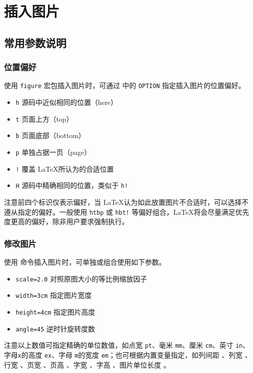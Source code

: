 \section{插入图片}
\subsection{常用参数说明}
\subsubsection{位置偏好}
使用 \texttt{figure} 宏包插入图片时，可通过 \latex{\begin{figure}[OPTION]} 中的 \texttt{OPTION} 指定插入图片的位置偏好。

\begin{itemize}
    \item \texttt{h} 源码中近似相同的位置（here）
    \item \texttt{t} 页面上方（top）
    \item \texttt{b} 页面底部（bottom）
    \item \texttt{p} 单独占据一页（page）
    \item \texttt{!} 覆盖 \LaTeX 所认为的合适位置
    \item \texttt{H} 源码中精确相同的位置，类似于 \texttt{h!}
\end{itemize}

注意前四个标识仅表示偏好，当 \LaTeX 认为如此放置图片不合适时，可以选择不遵从指定的偏好。一般使用 \texttt{htbp} 或 \texttt{hbt!} 等偏好组合，\LaTeX 将会尽量满足优先度更高的偏好，除非用户要求强制执行。

\subsubsection{修改图片}
使用  命令插入图片时，可单独或组合使用如下参数。

\begin{itemize}
    \item \texttt{scale=2.0} 对照原图大小的等比例缩放因子
    \item \texttt{width=3cm} 指定图片宽度
    \item \texttt{height=4cm} 指定图片高度
    \item \texttt{angle=45} 逆时针旋转度数
\end{itemize}

注意以上数值可指定精确的单位数值，如点宽 \texttt{pt}、毫米 \texttt{mm}、厘米 \texttt{cm}、英寸 \texttt{in}、字母\texttt{x}的高度 \texttt{ex}、字母 \texttt{m}的宽度 \texttt{em}；也可根据内置变量指定，如列间距 \latex{\columnsep}、列宽 \latex{\columnwidth}、行宽 \latex{\linewidth}、页宽 \latex{\paperwidth}、页高 \latex{\paperheight}、字宽 \latex{\textwidth}、字高 \latex{\textheight}、图片单位长度 \latex{\unitlength}。


